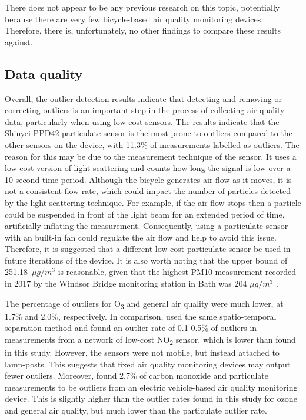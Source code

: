 \documentclass[11pt,twosided,a4paper]{report}
\begin{document}
There does not appear to be any previous research on this topic, potentially because there are very few bicycle-based air quality monitoring devices. Therefore, there is, unfortunately, no other findings to compare these results against.

\subsection{Data quality}

Overall, the outlier detection results indicate that detecting and removing or correcting outliers is an important step in the process of collecting air quality data, particularly when using low-cost sensors. The results indicate that the Shinyei PPD42 particulate sensor is the most prone to outliers compared to the other sensors on the device, with 11.3\% of measurements labelled as outliers. The reason for this may be due to the measurement technique of the sensor. It uses a low-cost version of light-scattering and counts how long the signal is low over a 10-second time period. Although the bicycle generates air flow as it moves, it is not a consistent flow rate, which could impact the number of particles detected by the light-scattering technique. For example, if the air flow stops then a particle could be suspended in front of the light beam for an extended period of time, artificially inflating the measurement. Consequently, using a particulate sensor with an built-in fan could regulate the air flow and help to avoid this issue. Therefore, it is suggested that a different low-cost particulate sensor be used in future iterations of the device. It is also worth noting that the upper bound of 251.18~$\mu g/m^3$ is reasonable, given that the highest PM10 measurement recorded in 2017 by the Windsor Bridge monitoring station in Bath was 204 $\mu g/m^3$ \citep{courthold2018max}.

The percentage of outliers for O\textsubscript{3} and general air quality were much lower, at 1.7\% and 2.0\%, respectively. In comparison, \cite{vanZoest2018outlierdetection} used the same spatio-temporal separation method and found an outlier rate of 0.1-0.5\% of outliers in measurements from a network of low-cost NO\textsubscript{2} sensor, which is lower than found in this study. However, the sensors were not mobile, but instead attached to lamp-posts. This suggests that fixed air quality monitoring devices may output fewer outliers. Moreover, \cite{Hagler2010durhamallelectric} found 2.7\% of carbon monoxide and particulate measurements to be outliers from an electric vehicle-based air quality monitoring device. This is slightly higher than the outlier rates found in this study for ozone and general air quality, but much lower than the particulate outlier rate.
\end{document}
